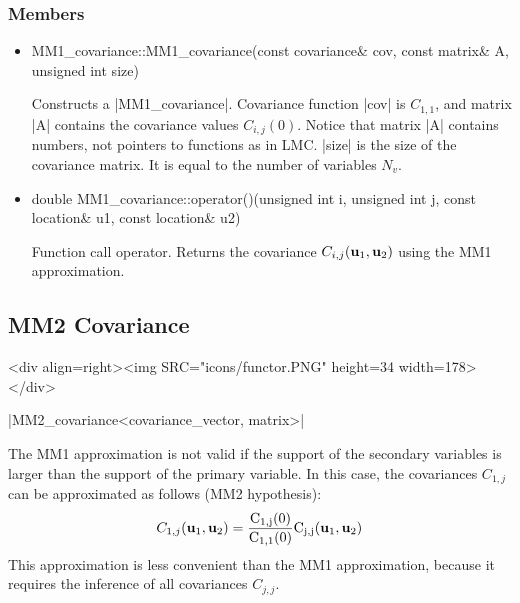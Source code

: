 \documentclass[12pt,twoside]{report}
\newcommand{\mloc}[1]{\rm{\bf #1}}
\begin{document}
 
\htmlrule[CLEAR=all]  \subsubsection*{Members}
\begin{itemize}

\item
 \begin{code} 
MM1_covariance::MM1_covariance(const covariance& cov,
                               const matrix& A, unsigned int size)
\end{code}

Constructs a |MM1_covariance|. Covariance function |cov| is $C_{1,1}$, and matrix |A| contains the covariance values $C_{i,j}(0)$. Notice that matrix |A| contains numbers, not pointers to functions as in LMC.
|size| is the size of the covariance matrix. It is equal to the number of variables $N_v$.

\item
 \begin{code} 
double MM1_covariance::operator()(unsigned int i, unsigned int j,
                                  const location& u1, const location& u2)
  \end{code}

Function call operator. Returns the covariance $C_{i,j}(\mloc{u}_1,\mloc{u}_2)$ using the MM1 approximation.
\end{itemize}










\subsection{MM2 Covariance}
\begin{htmlonly}
<div align=right><img SRC="icons/functor.PNG" height=34 width=178></div>
\end{htmlonly}

|MM2_covariance<covariance_vector, matrix>|
\vspace{0.3cm}

The MM1 approximation is not valid if the support of the secondary variables is larger than the support of the primary variable. In this case, the covariances $C_{1,j}$  can be approximated as follows (MM2 hypothesis):
\begin{displaymath}
  C_{1,j}(\mloc{u}_1,\mloc{u}_2) = \frac{C_{1,j}(0)}{C_{1,1}(0)}C_{j,j}(\mloc{u}_1,\mloc{u}_2)
\end{displaymath}
This approximation is less convenient than the MM1 approximation, because it requires the inference of all covariances $C_{j,j}$. 
\end{document}
